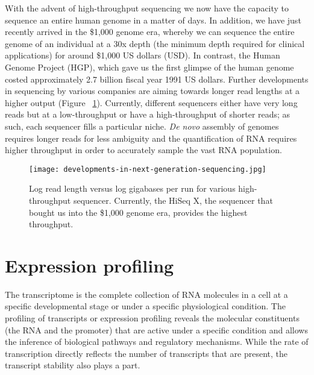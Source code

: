 With the advent of high-throughput sequencing we now have the capacity to sequence an entire human genome in a matter of days. In addition, we have just recently arrived in the \$1,000 genome era, whereby we can sequence the entire genome of an individual at a 30x depth (the minimum depth required for clinical applications) for around \$1,000 US dollars (USD). In contrast, the Human Genome Project (HGP), which gave us the first glimpse of the human genome\cite{lander2001initial} costed approximately 2.7 billion fiscal year 1991 US dollars\cite{nhgri2010cost}. Further developments in sequencing by various companies are aiming towards longer read lengths at a higher output (Figure ~\ref{fig:dev_next_gen}). Currently, different sequencers either have very long reads but at a low-throughput or have a high-throughput of shorter reads; as such, each sequencer fills a particular niche. \textit{De novo} assembly of genomes requires longer reads for less ambiguity and the quantification of RNA requires higher throughput in order to accurately sample the vast RNA population.

\begin{figure}[!ht]
   \centering
   \texttt{[image: developments-in-next-generation-sequencing.jpg]}
   \caption[Developments in next generation sequencing]{Log read length versus log gigabases per run for various high-throughput sequencer\cite{Nederbragt2012}. Currently, the HiSeq X, the sequencer that bought us into the \$1,000 genome era, provides the highest throughput.}
   \label{fig:dev_next_gen}
\end{figure}

\section{Expression profiling}

The transcriptome is the complete collection of RNA molecules in a cell at a specific developmental stage or under a specific physiological condition. The profiling of transcripts or expression profiling reveals the molecular constituents (the RNA and the promoter) that are active under a specific condition and allows the inference of biological pathways and regulatory mechanisms. While the rate of transcription directly reflects the number of transcripts that are present, the transcript stability also plays a part.

